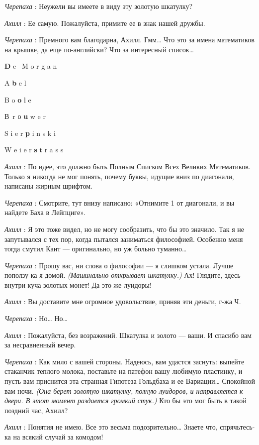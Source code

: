 \emph{Черепаха} : Неужели вы имеете в виду эту золотую шкатулку?

\emph{Ахилл} : Ее самую. Пожалуйста, примите ее в знак нашей дружбы.

\emph{Черепаха} : Премного вам благодарна, Ахилл. Гмм\ldots{} Что это за имена математиков на крышке, да еще по-английски? Что за интересный список\ldots{}

\textbf{D} e ~M o r g a n

A \textbf{b} e l

B o \textbf{o} l e

В~r о \textbf{u} w e r

S i e r \textbf{p} i n s k i

W e i e r \textbf{s} t r a s s

\emph{Ахилл} : По идее, это должно быть Полным Списком Всех Великих Математиков. Только я никогда не мог понять, почему буквы, идущие вниз по диагонали, написаны жирным шрифтом.

\emph{Черепаха} : Смотрите, тут внизу написано: «Отнимите 1 от диагонали, и вы найдете Баха в Лейпциге».

\emph{Ахилл} : Я это тоже видел, но не могу сообразить, что бы это значило. Так я не запутывался с тех пор, когда пытался заниматься философией. Особенно меня тогда смутил Кант --- оригинально, но уж больно туманно\ldots{}

\emph{Черепаха} : Прошу вас, ни слова о философии --- я слишком устала. Лучше поползу-ка я домой. \emph{(Машинально открывает шкатулку.)} Ах! Глядите, здесь внутри куча золотых монет! Да это же луидоры!

\emph{Ахилл} : Вы доставите мне огромное удовольствие, приняв эти деньги, г-жа Ч.

\emph{Черепаха} : Но\ldots{} Но\ldots{}

\emph{Ахилл} : Пожалуйста, без возражений. Шкатулка и золото --- ваши. И спасибо вам за несравненный вечер.

\emph{Черепаха} : Как мило с вашей стороны. Надеюсь, вам удастся заснуть: выпейте стаканчик теплого молока, поставьте на патефон вашу любимую пластинку, и пусть вам приснится эта странная Гипотеза Гольдбаха и ее Вариации\ldots{} Спокойной вам ночи. \emph{(Она берет золотую шкатулку, полную луидоров, и направляется к двери. В этот момент раздается громкий стук.)} Кто бы это мог быть в такой поздний час, Ахилл?

\emph{Ахилл} : Понятия не имею. Все это весьма подозрительно\ldots{} Знаете что, спрячьтесь-ка на всякий случай за комодом!

